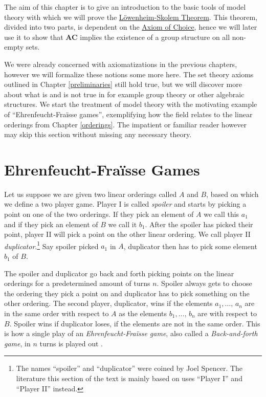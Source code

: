 \documentclass[../../main.tex]{subfiles}
\begin{document}
The aim of this chapter is to give an introduction to the basic tools of model theory with which we will prove the \hyperref[up-lowenheim-skolem]{Löwenheim-Skolem Theorem}.
This theorem, divided into two parts, is dependent on the \hyperref[choice-axiom]{Axiom of Choice}, 
hence we will later use it to show that \textbf{AC} implies the existence of a group structure on all non-empty sets.

We were already concerned with axiomatizations in the previous chapters, however we will formalize these notions some more here.
The set theory axioms outlined in Chapter \ref{preliminaries} still hold true, 
but we will discover more about what is and is not true in for example group theory or other algebraic structures.
We start the treatment of model theory with the motivating example of ``Ehrenfeucht-Fra\"isse games'', 
exemplifying how the field relates to the linear orderings from Chapter \ref{orderings}.
The impatient or familiar reader however may skip this section without missing any necessary theory.

\section{Ehrenfeucht-Fra\"isse Games}
Let us suppose we are given two linear orderings called $A$ and $B$, based on which we define a two player game.
Player I is called \textit{spoiler} and starts by picking a point on one of the two orderings.
If they pick an element of $A$ we call this $a_1$ and if they pick an element of $B$ we call it $b_1$.
After the spoiler has picked their point, player II will pick a point on the other linear ordering. 
We call player II \textit{duplicator}.\footnote{The names ``spoiler'' and ``duplicator'' were coined by Joel Spencer.\cite[\S 6]{Wil24}
The literature \cite{Ros82} this section of the text is mainly based on uses ``Player I'' and ``Player II'' instead.}
Say spoiler picked $a_1$ in $A$, duplicator then has to pick some element $b_1$ of $B$.

The spoiler and duplicator go back and forth picking points on the linear orderings for a predetermined amount of turns $n$.
Spoiler always gets to choose the ordering they pick a point on and duplicator has to pick something on the other ordering.
The second player, duplicator, wins if the elements $a_1,\ldots,\, a_n$ are in the same order with respect to $A$ as the elements $b_1,\ldots,\, b_n$ are with respect to $B$.
Spoiler wins if duplicator loses, if the elements are not in the same order. 
This is how a single play of an \textit{Ehrenfeucht-Fra\"isse game}, also called a \textit{Back-and-forth game}, in $n$ turns is played out \cite[\S 6.1]{Ros82}.
\end{document}
